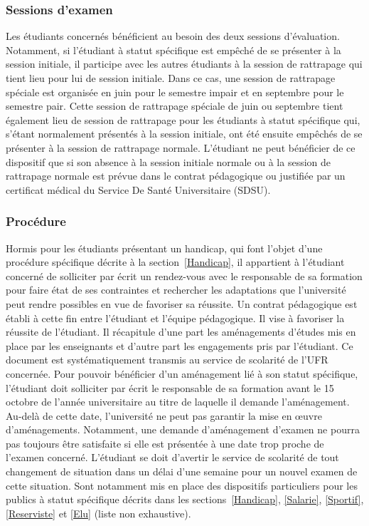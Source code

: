 \documentclass[a4paper,11pt]{article}
\begin{document}
\subsubsection{Sessions d'examen}\label{DispoExam}
Les étudiants concernés bénéficient au besoin des deux sessions d'évaluation. Notamment, si l'étudiant à statut spécifique est empêché de se présenter à la session initiale, il participe avec les autres étudiants à la session de rattrapage qui tient lieu pour lui de session initiale. Dans ce cas, une session de rattrapage spéciale est organisée en juin pour le semestre impair et en septembre pour le semestre pair.
Cette session de rattrapage spéciale de juin ou septembre tient également lieu de session de rattrapage pour les étudiants à statut spécifique qui, s'étant normalement présentés à la session initiale, ont été ensuite empêchés de se présenter à la session de rattrapage normale.
L'étudiant ne peut bénéficier de ce dispositif que si son absence à la session initiale normale ou à la session de rattrapage normale est prévue dans le contrat pédagogique ou justifiée par un certificat médical du Service De Santé Universitaire (SDSU).


\subsubsection{Procédure}
Hormis pour les étudiants présentant un handicap, qui font l'objet d'une procédure spécifique décrite à la section~\ref{Handicap}, il appartient à l'étudiant concerné de solliciter par écrit un rendez-vous avec le responsable de sa formation pour faire état de ses contraintes et rechercher les adaptations que l'université peut rendre possibles en vue de favoriser sa réussite. Un contrat pédagogique est établi à cette fin entre l'étudiant et l'équipe pédagogique. Il vise à favoriser la réussite de l'étudiant. Il récapitule d'une part les aménagements d'études mis en place par les enseignants et d'autre part les engagements pris par l'étudiant. Ce document est systématiquement transmis au service de scolarité de l'UFR concernée.
Pour pouvoir bénéficier d'un aménagement lié à son statut spécifique, l'étudiant doit solliciter par écrit le responsable de sa formation avant le 15 octobre de l'année universitaire au titre de laquelle il demande l'aménagement. Au-delà de cette date, l'université ne peut pas garantir la mise en \oe uvre d'aménagements. Notamment, une demande d'aménagement d'examen ne pourra pas toujours être satisfaite si elle est présentée à une date trop proche de l'examen concerné.
L'étudiant se doit d'avertir le service de scolarité de tout changement de situation dans un délai d'une semaine pour un nouvel examen de cette situation.
Sont notamment mis en place des dispositifs particuliers pour les publics à statut spécifique décrits dans les sections~\ref{Handicap}, \ref{Salarie}, \ref{Sportif}, \ref{Reserviste} et \ref{Elu} (liste non exhaustive).
\end{document}
